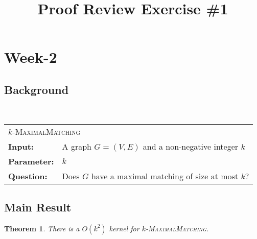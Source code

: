 \documentclass{article}
\title{Proof Review Exercise \#1}
\newcommand{\problem}[1]{\textsc{#1}}
\newtheorem{theorem}{Theorem}
\newcommand{\defproblem}[4]{%
  \hfill\\\smallskip\noindent%
  \begin{tabularx}{\textwidth}{|l X|}%
    \hline%
    \multicolumn{2}{|l|}{\problem{#1}}\\%
    \textbf{Input:}&#2\\%
    \textbf{Parameter:}&#3\\%
    \textbf{Question:}&#4\smallskip\\\hline%
  \end{tabularx}%
  \smallskip%
}%
\begin{document}
\maketitle

\section*{Week-2}
\subsection*{Background}

\defproblem{$k$-MaximalMatching}
{A graph $G = (V,E)$ and a non-negative integer $k$}
{$k$}
{Does $G$ have a maximal matching of size at most $k$?}

\subsection*{Main Result}

\begin{theorem}
There is a $O(k^2)$ kernel for \problem{$k$-MaximalMatching}.
\end{theorem}
\end{document}
